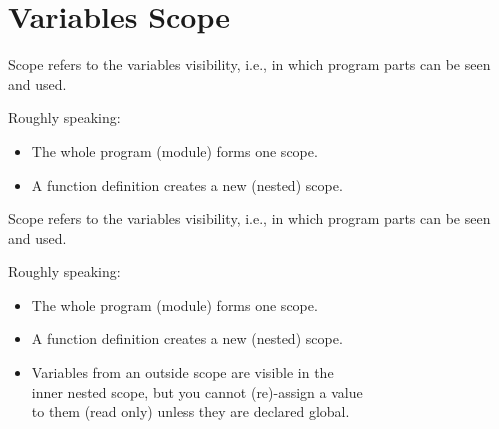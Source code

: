 \documentclass[aspectratio=1610,slidestop]{beamer}
\begin{document}
\section{Variables Scope}

\begin{pframe}
 Scope refers to the variables visibility, i.e., in which program parts can be seen and used.
 \medskip
 \pause

  Roughly speaking:
  \begin{itemize}
   \item The whole program (module) forms one scope.
   \item A function definition creates a new (nested) scope.
 \end{itemize}
\end{pframe}


\begin{pframe}
 \addtocounter{framenumber}{-1}
 Scope refers to the variables visibility, i.e., in which program parts can be seen and used.
 \medskip

  Roughly speaking:
  \begin{itemize}
   \item The whole program (module) forms one scope.
   \item A function definition creates a new (nested) scope.
   \item Variables from an outside scope are visible in the \\
         inner nested scope, but you cannot (re)-assign a value\\
         to them (read only) unless they are declared global.
 \end{itemize}
\end{pframe}
\end{document}
